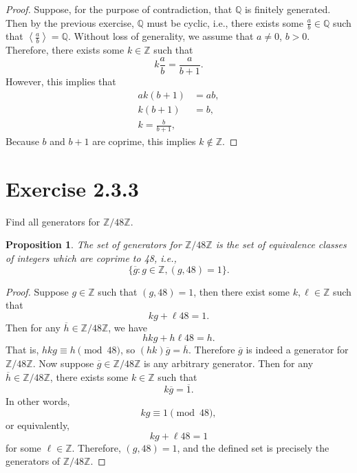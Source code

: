 \documentclass[12pt]{article}
\newtheorem{proposition}{Proposition}
\newenvironment{problem}
    {\begin{lrbox}{\mybox}\begin{minipage}{\textwidth-10pt}}
    {\end{minipage}\end{lrbox}\framebox[6.5in]{\usebox{\mybox}}}
\newcommand{\ds}{\displaystyle}
\newcommand{\<}{\left\langle}
\renewcommand{\>}{\right\rangle}
\newcommand{\Z}{\mathbb{Z}}
\newcommand{\Q}{\mathbb{Q}}
\begin{document}
\begin{proof}
    Suppose, for the purpose of contradiction, that $\Q$ is finitely generated. Then by the previous exercise, $\Q$ must be cyclic, i.e., there exists some $\ds\frac ab\in \Q$ such that $\ds\<\frac ab\> = \Q$. Without loss of generality, we assume that $a\ne0$, $b>0$. Therefore, there exists some $k\in\Z$ such that
    \[k\frac ab = \frac a{b+1}.\]
    However, this implies that
    \begin{align*}
        ak(b+1) &= ab, \\
        k(b+1) &= b, \\
        k = \frac b{b+1},
    \end{align*}
    Because $b$ and $b+1$ are coprime, this implies $k\notin\Z$.
    
\end{proof}

\newpage
\section*{Exercise 2.3.3}
\begin{problem}
    Find all generators for $\Z/48\Z$.
\end{problem}

\begin{proposition}
    The set of generators for $\Z/48\Z$ is the set of equivalence classes of integers which are coprime to 48, i.e.,
    \[\{\overline{g} : g\in\Z, (g,48) = 1\}.\]
\end{proposition}

\begin{proof}
    Suppose $g\in\Z$ such that $(g,48)=1$, then there exist some $k,\ell\in\Z$ such that
    \[kg + \ell48 = 1.\]
    Then for any $\overline{h}\in\Z/48\Z$, we have
    \[hkg + h\ell48 = h.\]
    That is, $hkg \equiv h \pmod{48}$, so $(hk)\overline{g} = \overline{h}$. Therefore $\overline{g}$ is indeed a generator for $\Z/48\Z$. Now suppose $\overline{g}\in\Z/48\Z$ is any arbitrary generator. Then for any $\overline{h}\in\Z/48\Z$, there exists some $k\in\Z$ such that
    \[k\overline{g} = \overline{1}.\]
    In other words,
    \[kg \equiv 1 \pmod{48},\]
    or equivalently,
    \[kg + \ell48 = 1\]
    for some $\ell\in\Z$. Therefore, $(g,48)=1$, and the defined set is precisely the generators of $\Z/48\Z$.
    
\end{proof}
\end{document}
